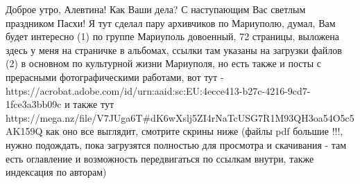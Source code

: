  
 
 
 
 

Доброе утро, Алевтина! Как Ваши дела? С наступающим Вас светлым праздником
Пасхи! Я тут сделал пару архивчиков по Мариуполю, думал, Вам будет интересно
(1) по группе Мариуполь довоенный, 72 страницы, выложена здесь у меня на
страничке в альбомах, ссылки там указаны на загрузки файлов (2) в основном по
культурной жизни Мариуполя, но есть также и посты с прерасными фотографическими
работами, вот тут -
https://acrobat.adobe.com/id/urn:aaid:sc:EU:4ecce413-b27c-4216-9cd7-1fce3a3bb09c
и также тут
https://mega.nz/file/V7JUga6T#dK6wXslj5ZI4rNaTcUSG7R1M93QH3oa54O5c5AK159Q как
оно все выглядит, смотрите скрины ниже (файлы pdf большие !!!, нужно подождать,
пока загрузятся полностью для просмотра и скачивания - там есть оглавление и
возможность передвигаться по ссылкам внутри, также индексация по авторам)
